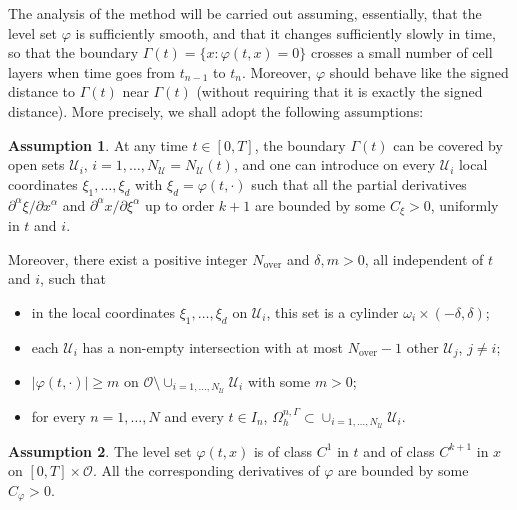 \documentclass[11pt,a4paper]{article}
\theoremstyle{plain}
\theoremstyle{definition}
\newtheorem{assumption}{Assumption}
\theoremstyle{remark}
\numberwithin{equation}{section}
\begin{document}
The analysis of the method will be carried out assuming, essentially, that the level set $\varphi$ is sufficiently smooth, and that it changes sufficiently slowly in time, so that the boundary $\Gamma(t)=\{x:\varphi(t,x)=0\}$ crosses a small number of cell layers when time goes from $t_{n-1}$ to $t_n$. Moreover, $\varphi$ should behave like the signed distance to $\Gamma(t)$ near $\Gamma(t)$ (without requiring that it is exactly the signed distance). More precisely, we shall adopt the following assumptions:

\begin{assumption}\label{asm0}
	At any time $t\in[0,T]$, the boundary $\Gamma(t)$ can be covered by open sets $\mathcal{U}_i$, $i=1,\ldots,N_{\mathcal{U}}=N_{\mathcal{U}}(t)$, and one can introduce on every $\mathcal{U}_i$ local coordinates $\xi_1,\ldots,\xi_d$ with $\xi_d=\varphi(t,\cdot)$ such that all the partial derivatives $\partial^\alpha\xi/\partial x^\alpha$ and $\partial^\alpha x/\partial \xi^\alpha$ up to order $k+1$ are bounded by some $C_{\xi}>0$, uniformly in $t$ and $i$. 
	{Moreover, there exist a positive integer $N_\text{over}$ and $\delta,m>0$, all independent of $t$ and $i$, such that
	\begin{itemize}
		\item[(i)] in the local coordinates $\xi_1,\ldots,\xi_d$ on $\mathcal{U}_i$, this set is a cylinder $\omega_i\times(-\delta,\delta)$;  %
		\item[(ii)] %
		each $\mathcal{U}_i$ has a non-empty intersection with at most $N_\text{over}-1$ other $\mathcal{U}_j$, $j\not =i$;
		\item[(iii)] $|\varphi(t,\cdot)|\ge m$ on $\mathcal{O}\setminus\cup_{i=1,\ldots,N_{\mathcal{U}}}\mathcal{U}_i$ with some $m>0$;
		\item[(iv)] for every $n=1,\ldots,N$ and every $t\in I_n$,  $\Omega_h^{n,\Gamma}\subset\cup_{i=1,\ldots,N_{\mathcal{U}}}\mathcal{U}_i$.   
	\end{itemize}}
\end{assumption}


\begin{assumption}\label{asm1}
	The level set  $\varphi(t,x)$ is of class $C^1$ in $t$ and of class ${C^{k+1}}$ in $x$ on $[0,T]\times \mathcal{O}$. All the corresponding derivatives of $\varphi$ are bounded by some $C_{\varphi}>0$.
\end{assumption}
\end{document}
